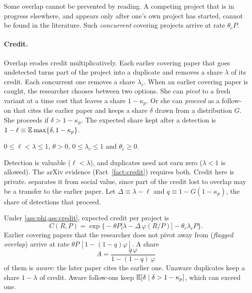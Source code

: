 Some overlap cannot be prevented by reading. A competing project that is in
progress elsewhere, and appears only after one's own project has started,
cannot be found in the literature. Such \emph{concurrent} covering projects
arrive at rate $\theta_cP$.

\paragraph{Credit.} Overlap erodes credit multiplicatively. Each earlier
covering paper that goes undetected turns part of the project into a
duplicate and removes a share $\lambda$ of its credit. Each concurrent one
removes a share $\lambda_c$. When an earlier covering paper is caught, the
researcher chooses between two options. She can \emph{pivot} to a fresh
variant at a time cost that leaves a share $1-\kappa_p$. Or she can
\emph{proceed} as a follow-on that cites the earlier paper and keeps a share
$\delta$ drawn from a distribution $G$. She proceeds if $\delta>1-\kappa_p$.
The expected share kept after a detection is
$1-\ell\equiv\mathbb{E}\max\{\delta,1-\kappa_p\}$.

\begin{assumption}[Credit]\label{ass:credit}
$0\le \ell<\lambda\le 1$, $\theta>0$, $0\le\lambda_c\le1$ and $\theta_c\ge0$.
\end{assumption}

Detection is valuable ($\ell<\lambda$), and duplicates need not earn zero
($\lambda<1$ is allowed). The arXiv evidence (Fact~\ref{fact:credit}) requires
both. Credit here is private.  separates it from social
value, since part of the credit lost to overlap may be a transfer to the
earlier paper. Let $\Delta\equiv\lambda-\ell$ and $q\equiv 1-G(1-\kappa_p)$, the
share of detections that proceed.

\begin{lemma}\label{lem:credit}
Under \cref{ass:phi,ass:credit}, expected credit per project is
\begin{equation}\label{eq:credit}
C(R,P)=\exp\!\Big\{-\theta P\big[\lambda-\Delta\,\varphi(R/P)\big]-\theta_c\lambda_cP\Big\}.
\end{equation}
Earlier covering papers that the researcher does not pivot away from
(\emph{flagged overlap}) arrive at rate $\theta P\,[1-(1-q)\varphi]$. A share
\begin{equation}\label{eq:aware}
A=\frac{q\,\varphi}{1-(1-q)\,\varphi}
\end{equation}
of them is \emph{aware}: the later paper cites the earlier one. Unaware
duplicates keep a share $1-\lambda$ of credit. Aware follow-ons keep
$\mathbb{E}[\delta\mid\delta>1-\kappa_p]$, which can exceed one.
\end{lemma}

